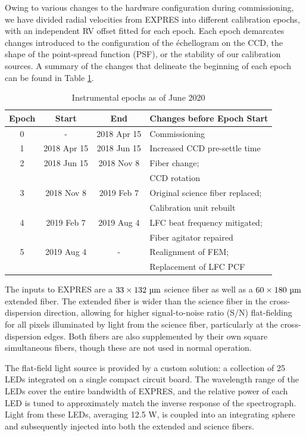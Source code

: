 Owing to various changes to the hardware configuration during commissioning, we have divided radial velocities from EXPRES into different calibration epochs, with an independent RV offset fitted for each epoch. Each epoch demarcates changes introduced to the configuration of the \'echellogram on the CCD, the shape of the point-spread function (PSF), or the stability of our calibration sources. A summary of the changes that delineate the beginning of each epoch can be found in Table \ref{tab:epochs}.

\begin{table}[ht!]
\centering
\caption[EXPRES instrumental epochs]{Instrumental epochs as of June 2020\label{tab:epochs}}
\begin{tabular}{cccl}
\hline
Epoch & Start & End & Changes before Epoch Start \\
\hline
0 & - & 2018 Apr 15 & Commissioning \\
1 & 2018 Apr 15 & 2018 Jun 15 & Increased CCD pre-settle time \\
2 & 2018 Jun 15 & 2018 Nov 8 & Fiber change; \\
 & & & CCD rotation \\
3 & 2018 Nov 8 & 2019 Feb 7 & Original science fiber replaced; \\
 & & &  Calibration unit rebuilt \\
4 & 2019 Feb 7 & 2019 Aug 4 & LFC beat frequency mitigated; \\
 & & &  Fiber agitator repaired \\
5 & 2019 Aug 4 & - & Realignment of FEM; \\
& & &  Replacement of LFC PCF
\\
\hline
\end{tabular}
\end{table}

The inputs to EXPRES are a $33 \times 132 ~\si{\micro\meter}$ science fiber as well as a $60 \times 180 ~\si{\micro\meter}$ extended fiber. The extended fiber is wider than the science fiber in the cross-dispersion direction, allowing for higher signal-to-noise ratio (S/N) flat-fielding for all pixels illuminated by light from the science fiber, particularly at the cross-dispersion edges. Both fibers are also supplemented by their own square simultaneous fibers, though these are not used in normal operation.

The flat-field light source is provided by a custom solution: a collection of 25 LEDs integrated on a single compact circuit board. The wavelength range of the LEDs cover the entire bandwidth of EXPRES, and the relative power of each LED is tuned to approximately match the inverse response of the spectrograph. Light from these LEDs, averaging 12.5 W, is coupled into an integrating sphere and subsequently injected into both the extended and science fibers.

